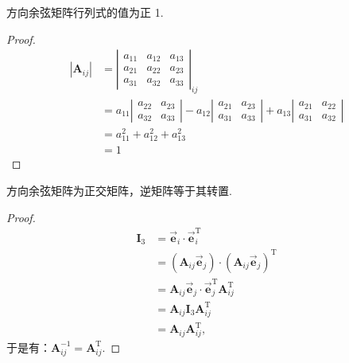 \begin{property}[性质四]\label{prop:dcm-det}
	方向余弦矩阵行列式的值为正 1.
\end{property}
\begin{proof}
	$$\begin{aligned}
		\left| \boldsymbol{A}_{i j}\right|  & =\left|\begin{array}{ccc}
			a_{11} & a_{12} & a_{13} \\
			a_{21} & a_{22} & a_{23} \\
			a_{31} & a_{32} & a_{33}
		\end{array}\right|_{i j} \\
		& =a_{11}\left|\begin{array}{cc}
			a_{22} & a_{23} \\
			a_{32} & a_{33}
		\end{array}\right|-a_{12}\left|\begin{array}{cc}
			a_{21} & a_{23} \\
			a_{31} & a_{33}
		\end{array}\right|+a_{13}\left|\begin{array}{cc}
			a_{21} & a_{22} \\
			a_{31} & a_{32}
		\end{array}\right| \\
		& =a_{11}^{2}+a_{12}^{2}+a_{13}^{2} \\
		& =1
	\end{aligned}$$
\end{proof}

\begin{property}[性质五]\label{prop:dcm-orthogonal}
	方向余弦矩阵为正交矩阵，逆矩阵等于其转置.
\end{property}
\begin{proof}
	$$\begin{aligned}
		\boldsymbol{I}_{3} & =\overrightarrow{\boldsymbol{e}}_{i} \cdot \overrightarrow{\boldsymbol{e}}_{i}^{\mathrm{T}} \\
		& =\left(\boldsymbol{A}_{i j} \overrightarrow{\boldsymbol{e}}_{j}\right) \cdot\left(\boldsymbol{A}_{i j} \overrightarrow{\boldsymbol{e}}_{j}\right)^{\mathrm{T}} \\
		& =\boldsymbol{A}_{i j} \overrightarrow{\boldsymbol{e}}_{j} \cdot \overrightarrow{\boldsymbol{e}}_{j}^{\mathrm{T}} \boldsymbol{A}_{i j}^{\mathrm{T}} \\
		& =\boldsymbol{A}_{i j} \boldsymbol{I}_{3} \boldsymbol{A}_{i j}^{\mathrm{T}} \\
		& =\boldsymbol{A}_{i j} \boldsymbol{A}_{i j}^{\mathrm{T}},
	\end{aligned}$$
	于是有：$\boldsymbol{A}_{i j}^{-1}=\boldsymbol{A}_{i j}^{\mathrm{T}} .$
\end{proof}

